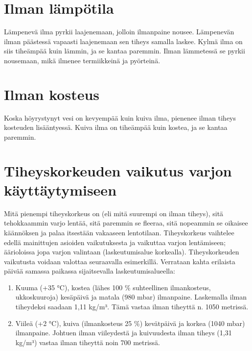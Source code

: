 \section{ Ilman lämpötila }
\label{ilmakehan-fysikaalisten-ominaisuuksien-vaikutukset-laskuvarjon-suorituskykyyn-ilman-lampotila}


Lämpenevä ilma pyrkii laajenemaan, jolloin ilmanpaine nousee. Lämpenevän ilman päästessä vapaasti laajenemaan sen tiheys samalla laskee. Kylmä ilma on siis tiheämpää kuin lämmin, ja se kantaa paremmin. Ilman lämmetessä se pyrkii nousemaan, mikä ilmenee termiikkeinä ja pyörteinä. 

\section{ Ilman kosteus }
\label{ilmakehan-fysikaalisten-ominaisuuksien-vaikutukset-laskuvarjon-suorituskykyyn-ilman-kosteus}


Koska höyrystynyt vesi on kevyempää kuin kuiva ilma, pienenee ilman tiheys kosteuden lisääntyessä. Kuiva ilma on tiheämpää kuin kostea, ja se kantaa paremmin. 

\section{ Tiheyskorkeuden vaikutus varjon käyttäytymiseen }
\label{ilmakehan-fysikaalisten-ominaisuuksien-vaikutukset-laskuvarjon-suorituskykyyn-tiheyskorkeuden-vaikutus-varjon-kayttaytymiseen}


Mitä pienempi tiheyskorkeus on (eli mitä suurempi on ilman tiheys), sitä tehokkaammin varjo lentää, sitä paremmin se fleeraa, sitä nopeammin se oikaisee käännöksen ja palaa itsestään vakaaseen lentotilaan. Tiheyskorkeus vaihtelee edellä mainittujen asioiden vaikutuksesta ja vaikuttaa varjon lentämiseen; äärioloissa jopa varjon valintaan (laskeutumisalue korkealla). Tiheyskorkeuden vaikutusta voidaan valottaa seuraavalla esimerkillä. Verrataan kahta erilaista päivää samassa paikassa sijaitsevalla laskeutumisalueella: 

\begin{enumerate}[label=\bfseries \arabic*)]
\item  Kuuma (+35 °C), kostea (lähes 100 \% suhteellinen ilmankosteus, ukkoskuuroja) kesäpäivä ja matala (980 mbar) ilmanpaine. Laskemalla ilman tiheydeksi saadaan 1,11 kg/m³. Tämä vastaa ilman tiheyttä n. 1050 metrissä. 
\item  Viileä (+2 °C), kuiva (ilmankosteus 25 \%) kevätpäivä ja korkea (1040 mbar) ilmanpaine. Johtuen ilman viileydestä ja kuivuudesta ilman tiheys (1,31 kg/m³) vastaa ilman tiheyttä noin 700 metrissä. 
\end{enumerate}

